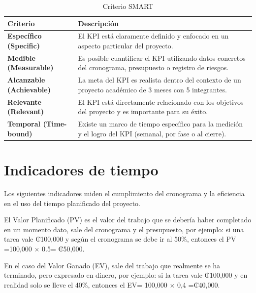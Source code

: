 \documentclass[11pt,spanish]{article}
\begin{document}
\begin{table}[H]
\centering
\small
\caption{Criterio SMART}\label{tab:criterio-smart}
\begin{tabularx}{\textwidth}{p{4.5cm} Y}
\toprule
\textbf{Criterio} & \textbf{Descripción} \\
\midrule
\textbf{Específico (Specific)} & El KPI está claramente definido y enfocado en un aspecto particular del proyecto. \\
\textbf{Medible (Measurable)} & Es posible cuantificar el KPI utilizando datos concretos del cronograma, presupuesto o registro de riesgos. \\
\textbf{Alcanzable (Achievable)} & La meta del KPI es realista dentro del contexto de un proyecto académico de 3 meses con 5 integrantes. \\
\textbf{Relevante (Relevant)} & El KPI está directamente relacionado con los objetivos del proyecto y es importante para su éxito. \\
\textbf{Temporal (Time-bound)} & Existe un marco de tiempo específico para la medición y el logro del KPI (semanal, por fase o al cierre). \\
\bottomrule
\end{tabularx}
\end{table}

\section{Indicadores de tiempo}

Los siguientes indicadores miden el cumplimiento del cronograma y la eficiencia en el uso del tiempo planificado del proyecto.

El Valor Planificado (PV) es el valor del trabajo que se debería haber completado en un momento dato, sale del cronograma y el presupuesto, por ejemplo: si una tarea vale ₡100,000 y según el cronograma se debe ir al 50\%, entonces el PV =100,000 $\times$ 0.5= ₡50,000.

En el caso del Valor Ganado (EV), sale del trabajo que realmente se ha terminado, pero expresado en dinero, por ejemplo: si la tarea vale ₡100,000 y en realidad solo se lleve el 40\%, entonces el EV= 100,000 $\times$ 0,4 =₡40,000.
\end{document}
